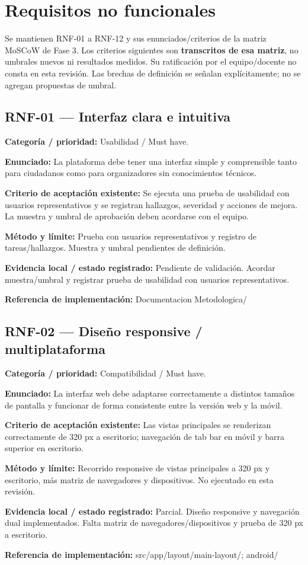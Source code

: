 \section{Requisitos no funcionales}
\label{sec:rnf}
Se mantienen RNF-01 a RNF-12 y sus enunciados/criterios de la matriz MoSCoW de Fase 3.
Los criterios siguientes son \textbf{transcritos de esa matriz}, no umbrales nuevos ni
resultados medidos. Su ratificación por el equipo/docente no consta en esta revisión.
Las brechas de definición se señalan explícitamente; no se agregan propuestas de umbral.

\subsection{RNF-01 — Interfaz clara e intuitiva}
\textbf{Categoría / prioridad:} Usabilidad / Must have.\par
\textbf{Enunciado:} La plataforma debe tener una interfaz simple y comprensible tanto para ciudadanos como para organizadores sin conocimientos técnicos.\par
\textbf{Criterio de aceptación existente:} Se ejecuta una prueba de usabilidad con usuarios representativos y se registran hallazgos, severidad y acciones de mejora. La muestra y umbral de aprobación deben acordarse con el equipo.\par
\textbf{Método y límite:} Prueba con usuarios representativos y registro de tareas/hallazgos. Muestra y umbral pendientes de definición.\par
\textbf{Evidencia local / estado registrado:} Pendiente de validación. Acordar muestra/umbral y registrar prueba de usabilidad con usuarios representativos.\par
\textbf{Referencia de implementación:} Documentacion Metodologica/\par

\subsection{RNF-02 — Diseño responsive / multiplataforma}
\textbf{Categoría / prioridad:} Compatibilidad / Must have.\par
\textbf{Enunciado:} La interfaz web debe adaptarse correctamente a distintos tamaños de pantalla y funcionar de forma consistente entre la versión web y la móvil.\par
\textbf{Criterio de aceptación existente:} Las vistas principales se renderizan correctamente de 320 px a escritorio; navegación de tab bar en móvil y barra superior en escritorio.\par
\textbf{Método y límite:} Recorrido responsive de vistas principales a 320 px y escritorio, más matriz de navegadores y dispositivos. No ejecutado en esta revisión.\par
\textbf{Evidencia local / estado registrado:} Parcial. Diseño responsive y navegación dual implementados. Falta matriz de navegadores/dispositivos y prueba de 320 px a escritorio.\par
\textbf{Referencia de implementación:} src/app/layout/main-layout/; android/\par

